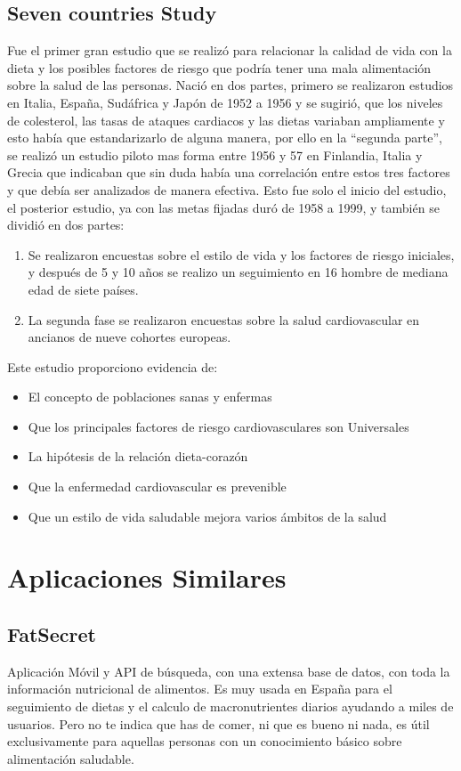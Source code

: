 \subsection{Seven countries Study}
Fue el primer gran estudio que se realizó para relacionar la calidad de vida con la dieta y los posibles factores de riesgo que podría tener una mala alimentación sobre la salud de las personas.
Nació en dos partes, primero se realizaron estudios en Italia, España, Sudáfrica y Japón de 1952 a 1956 y se sugirió, que los niveles de colesterol, las tasas de ataques cardiacos y las dietas variaban ampliamente y esto había que estandarizarlo de alguna manera, por ello en la “segunda parte”, se realizó un estudio piloto mas forma entre 1956 y 57 en Finlandia, Italia y Grecia que indicaban que sin duda había una correlación entre estos tres factores y que debía ser analizados de manera efectiva.
Esto fue solo el inicio del estudio, el posterior estudio, ya con las metas fijadas duró de 1958 a 1999, y también se dividió en dos partes:\\
\begin{enumerate}
	\item Se realizaron encuestas sobre el estilo de vida y los factores de riesgo iniciales, y después de 5 y 10 años se realizo un seguimiento en 16 hombre de mediana edad de siete países.
	\item La segunda fase se realizaron encuestas sobre la salud cardiovascular en ancianos de nueve cohortes europeas.
\end{enumerate}
Este estudio proporciono evidencia de:
\begin{itemize}
\item El concepto de poblaciones sanas y enfermas
\item Que los principales factores de riesgo cardiovasculares son Universales
\item La hipótesis de la relación dieta-corazón
\item Que la enfermedad cardiovascular es prevenible
\item Que un estilo de vida saludable mejora varios ámbitos de la salud

\end{itemize}

\section{Aplicaciones Similares}
\subsection{FatSecret}
Aplicación Móvil y API de búsqueda, con una extensa base de datos, con toda la información nutricional de alimentos. Es muy usada en España para el seguimiento de dietas y el calculo de macronutrientes diarios ayudando a miles de usuarios. Pero no te indica que has de comer, ni que es bueno ni nada, es útil exclusivamente para aquellas personas con un conocimiento básico sobre alimentación saludable. \\
